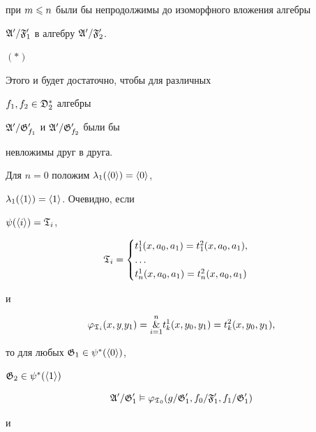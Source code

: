 \begin{pf}
{{{при $m\leqslant n$ были бы непродолжимы до изоморфного вложения алгебры


$\frak A'/\frak F'_1$ в алгебру $\frak A'/\frak F'_2$.


}}


\hfill $(\ast)$}







Этого и будет достаточно, чтобы для различных


$f_1,f_2\in\frak D^*_2$ алгебры


$\frak A'/\frak G'_{f_1}$ и $\frak A'/\frak G'_{f_2}$ были бы


невложимы друг в друга.





Для $n=0$ положим $\lambda_1(\langle 0\rangle)=\langle 0\rangle$,


$\lambda_1(\langle 1\rangle)=\langle 1\rangle$. Очевидно, если


$\psi(\langle i \rangle)=\frak T_i$,


$$


\frak T_i=


\begin{cases}


t^1_1(x,a_0,a_1)=t^2_1(x,a_0,a_1),\\


\dots \\


t^1_n(x,a_0,a_1)=t^2_n(x,a_0,a_1)


\end{cases}


$$


и


$$


\varphi_{\frak T_i}(x,y_,y_1)=


\overset{n}{\underset{i=1}{\&}}{}


t^1_k(x,y_0,y_1)=t^2_k(x,y_0,y_1),


$$


то для любых $\frak G_1\in\psi^*(\langle 0\rangle)$,


$\frak G_2\in\psi^*(\langle 1\rangle)$


$$


\frak A'/\frak G'_1\vDash \varphi_{\frak T_0}


(g/\frak G'_1,f_0/\frak F'_1,f_1/\frak G'_1)


$$


и


$$



\end{pf}
